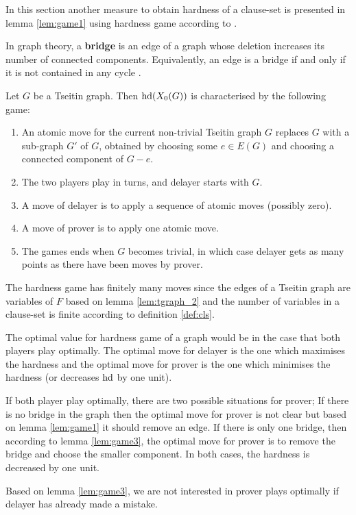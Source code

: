 \documentclass[12pt]{book}
\begin{document}
In this section another measure to obtain hardness of a clause-set is presented in lemma \ref{lem:game1} using hardness game according to \cite{h5}.

\begin{defi}\label{def:bridge}
      In graph theory, a \textbf{bridge} is an edge of a graph whose deletion increases its number of connected components. Equivalently, 
	  an edge is a bridge if and only if it is not contained in any cycle \cite{h15}.  
\end{defi}

\begin{lem}\label{lem:game1}
      Let $G$ be a Tseitin graph. Then $\operatorname{hd}(X_0(G))$ is characterised by the following game:
	  \begin{enumerate}
	  \item An atomic move for the current non-trivial Tseitin graph $G$ replaces $G$ with a sub-graph $G'$ of $G$, obtained by choosing 
	  some $e \in E(G)$ and choosing a connected component of $G - e$.
	  \item The two players play in turns, and delayer starts with $G$.
	  \item A move of delayer is to apply a sequence of atomic moves (possibly zero).
	  \item A move of prover is to apply one atomic move.
	  \item The games ends when $G$ becomes trivial, in which case delayer gets as many points as there have been moves by prover.
	  \end{enumerate}
\end{lem} 
\begin{lem}\label{lem:game2}
      The hardness game has finitely many moves since the edges of a Tseitin graph are variables of $F$ based on lemma \ref{lem:tgraph_2} and 
	  the number of variables in a clause-set is finite according to definition \ref{def:cls}.
\end{lem}
\begin{lem}\label{lem:game3}
      The optimal value for hardness game of a graph would be in the case that both players play optimally. The optimal move for delayer 
	  is the one which maximises the hardness and the optimal move for prover is the one which minimises the hardness (or decreases $\operatorname{hd}$ by one unit).
\end{lem}
\begin{lem}\label{lem:game6}
      If both player play optimally, there are two possible situations for prover; If there is no bridge in the graph then the optimal move for 
	  prover is not clear but based on lemma \ref{lem:game1} it should remove an edge. If there is only one bridge, then according to lemma 
	  \ref{lem:game3}, the optimal move for prover is to remove the bridge and choose the smaller component. In both cases, the hardness is 
	  decreased by one unit. 
\end{lem}
\begin{lem}\label{lem:game4}
      Based on lemma \ref{lem:game3}, we are not interested in prover plays optimally if delayer has already made a mistake.
\end{lem}
\end{document}
